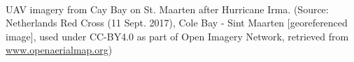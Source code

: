 \thispagestyle{empty}

\hfill
\vfill %


\begingroup
{}\\
\endgroup
UAV imagery from Cay Bay on St. Maarten after Hurricane Irma. (Source: Netherlands Red Cross (11 Sept. 2017), Cole Bay - Sint Maarten [georeferenced image], used under CC-BY4.0 as part of Open Imagery Network, retrieved from \url{www.openaerialmap.org})